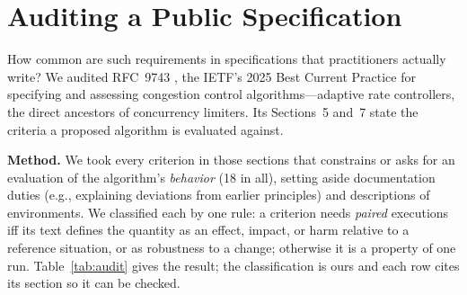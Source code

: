 \documentclass[sigconf,review,anonymous]{acmart}
\begin{document}
	\section{Auditing a Public Specification}
	\label{sec:audit}
	
	How common are such requirements in specifications that practitioners
	actually write? We audited RFC~9743 \cite{rfc9743}, the IETF's 2025 Best
	Current Practice for specifying and assessing congestion control
	algorithms---adaptive rate controllers, the direct ancestors of
	concurrency limiters. Its Sections~5 and~7 state the criteria a proposed
	algorithm is evaluated against.
	
	\textbf{Method.} We took every criterion in those sections that
	constrains or asks for an evaluation of the algorithm's \emph{behavior}
	(18 in all), setting aside documentation duties (e.g., explaining
	deviations from earlier principles) and descriptions of environments. We
	classified each by one rule: a criterion needs \emph{paired} executions
	iff its text defines the quantity as an effect, impact, or harm relative
	to a reference situation, or as robustness to a change; otherwise it is
	a property of one run. Table~\ref{tab:audit} gives the result; the
	classification is ours and each row cites its section so it can be
	checked.
	
\end{document}
